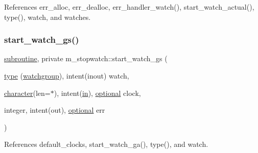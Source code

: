 References err\+\_\+alloc, err\+\_\+dealloc, err\+\_\+handler\+\_\+watch(), start\+\_\+watch\+\_\+actual(), type(), watch, and watches.

\mbox{\label{namespacem__stopwatch_a7c2f2f99682a7309aa136e7129bd3591}} 
\subsubsection{\texorpdfstring{start\+\_\+watch\+\_\+gs()}{start\_watch\_gs()}}
{\footnotesize\ttfamily \hyperlink{M__stopwatch_83_8txt_acfbcff50169d691ff02d4a123ed70482}{subroutine}, private m\+\_\+stopwatch\+::start\+\_\+watch\+\_\+gs (\begin{DoxyParamCaption}\item[{\hyperlink{stop__watch_83_8txt_a70f0ead91c32e25323c03265aa302c1c}{type} (\hyperlink{structm__stopwatch_1_1watchgroup}{watchgroup}), intent(inout)}]{watch,  }\item[{\hyperlink{option__stopwatch_83_8txt_abd4b21fbbd175834027b5224bfe97e66}{character}(len=$\ast$), intent(\hyperlink{M__journal_83_8txt_afce72651d1eed785a2132bee863b2f38}{in}), \hyperlink{option__stopwatch_83_8txt_aa4ece75e7acf58a4843f70fe18c3ade5}{optional}}]{clock,  }\item[{integer, intent(out), \hyperlink{option__stopwatch_83_8txt_aa4ece75e7acf58a4843f70fe18c3ade5}{optional}}]{err }\end{DoxyParamCaption})\hspace{0.3cm}{\ttfamily [private]}}



References default\+\_\+clocks, start\+\_\+watch\+\_\+ga(), type(), and watch.

\mbox{\label{namespacem__stopwatch_a4bd2594f2e02c3b97ff6f0556477b720}} 
